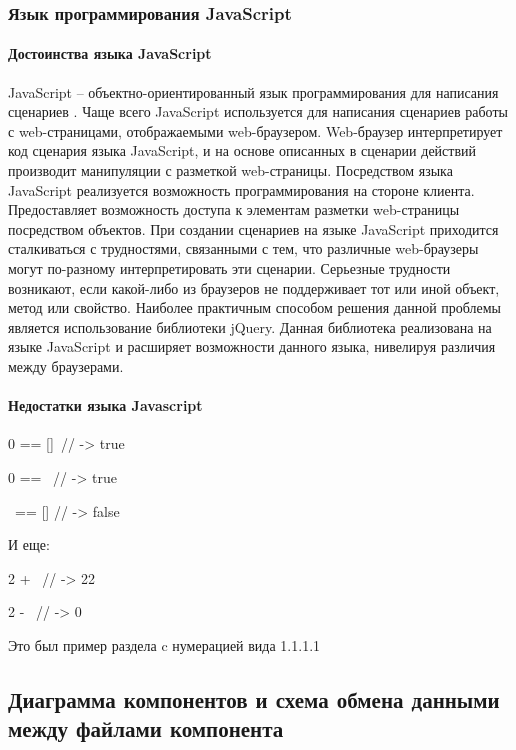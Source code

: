 \subsubsection{Язык программирования JavaScript}

\paragraph{Достоинства языка JavaScript}

JavaScript – объектно-ориентированный язык программирования для написания сценариев \cite{javascript}. Чаще всего JavaScript используется для написания сценариев работы с web-страницами, отображаемыми web-браузером. Web-бра\-у\-зер интерпретирует код сценария языка JavaScript, и на основе описанных в сценарии действий производит манипуляции с разметкой web-страницы. Посредством языка JavaScript реализуется возможность программирования на стороне клиента. Предоставляет возможность доступа к элементам разметки web-страницы посредством объектов. При создании сценариев на языке JavaScript приходится сталкиваться с трудностями, связанными с тем, что различные web-браузеры могут по-разному интерпретировать эти сценарии. Серьезные трудности возникают, если какой-либо из браузеров не поддерживает тот или иной объект, метод или свойство. Наиболее практичным способом решения данной проблемы является использование библиотеки jQuery. Данная библиотека реализована на языке JavaScript и расширяет возможности данного языка, нивелируя различия между браузерами.

\paragraph{Недостатки языка Javascript}

0 == []\ // -> true

0 == \textquotedbl\ // -> true

\textquotedbl\ == [] // -> false

И еще:

2 + \textquotedbl\ // -> 22

2 - \textquotedbl\ // -> 0

Это был пример раздела c нумерацией вида 1.1.1.1

\subsection{Диаграмма компонентов и схема обмена данными между файлами компонента}

